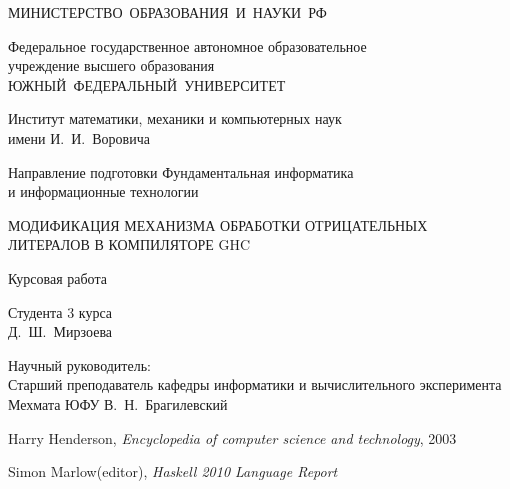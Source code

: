 \documentclass [fontsize=14pt, paper=a4, pagesize, DIV=calc]%
{scrreprt}
\begin{document}
\begin{titlepage}

\centering

\vfill

МИНИСТЕРСТВО~ОБРАЗОВАНИЯ~И~НАУКИ~РФ

\vfill

Федеральное государственное автономное образовательное\\
учреждение высшего образования\\
ЮЖНЫЙ~ФЕДЕРАЛЬНЫЙ~УНИВЕРСИТЕТ

\vfill

Институт математики, механики и компьютерных наук\\
имени И.~И.~Воровича

\vfill

Направление подготовки Фундаментальная информатика\\
и информационные технологии

\vfill

\textsf
{МОДИФИКАЦИЯ МЕХАНИЗМА ОБРАБОТКИ ОТРИЦАТЕЛЬНЫХ ЛИТЕРАЛОВ В КОМПИЛЯТОРЕ GHC}

\vfill

Курсовая работа

\raggedleft

\vfill

Студента 3 курса\\
Д.~Ш.~Мирзоева

\vfill

Научный руководитель:\\
Старший преподаватель кафедры информатики и вычислительного эксперимента
Мехмата ЮФУ В.~Н.~Брагилевский

\end{titlepage}


\tableofcontents









\begin{thebibliography}{9}

Harry Henderson,
\emph{Encyclopedia of computer science and technology},
2003

Simon Marlow(editor),
\emph{Haskell 2010 Language Report}

\end{thebibliography}
\end{document}
